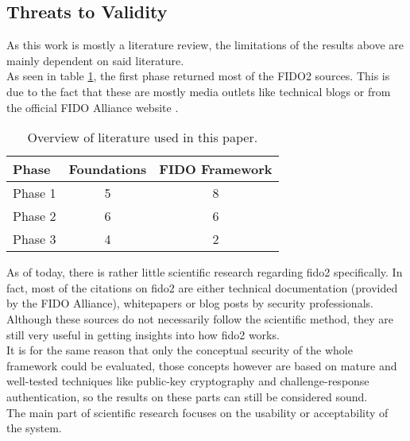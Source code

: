 \subsection{Threats to Validity}
\label{subsec:validity_threats}

As this work is mostly a literature review, the limitations of the results above are mainly dependent on said literature.\\

As seen in table \ref{tab:literature_review}, the first phase returned most of the FIDO2 sources. This is due to the fact that these are mostly media outlets like technical blogs \cite{hunt2018b,leitner2019, chonng2018, ng2019, mingis2020} or from the official FIDO Alliance website \cite{fido2_overview,fido2_webauthn,fido_history}.

\begin{table}[ht]
    \centering
    \caption{Overview of literature used in this paper.}
    \label{tab:literature_review}
    \begin{tabular}{ l | c | c }
        \textbf{Phase} & \textbf{Foundations} & \textbf{FIDO Framework}\\
        \hline
        Phase 1 & 5 & 8\\
        Phase 2 & 6 & 6\\
        Phase 3 & 4 & 2\\
    \end{tabular}
\end{table}

\noindent As of today, there is rather little scientific research regarding \ac{fido2} specifically. In fact, most of the citations on \ac{fido2} are either technical documentation (provided by the FIDO Alliance), whitepapers or blog posts by security professionals. Although these sources do not necessarily follow the scientific method, they are still very useful in getting insights into how \ac{fido2} works.\\
It is for the same reason that only the conceptual security of the whole framework could be evaluated, those concepts however are based on mature and well-tested techniques like public-key cryptography and challenge-response authentication, so the results on these parts can still be considered sound.\\
The main part of scientific research focuses on the usability or acceptability of the system.